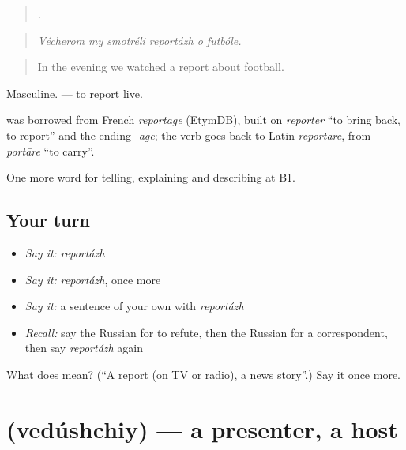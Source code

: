 \begin{quote}
     .
\end{quote}

\begin{quote}
\emph{Vécherom my smotréli reportázh o futbóle.}
\end{quote}

\begin{quote}
In the evening we watched a report about football.
\end{quote}

Masculine. \emph{ } — to report live.

\begin{cousinweb}
\emph{} was borrowed from French \emph{reportage} (EtymDB), built on \emph{reporter} \textquotedblleft{}to bring back, to report\textquotedblright{} and the ending \emph{-age}; the verb goes back to Latin \emph{reportāre}, from \emph{portāre} \textquotedblleft{}to carry\textquotedblright{}.
\end{cousinweb}

\begin{grammarlens}[title={What you've built}]
One more word for telling, explaining and describing at B1.
\end{grammarlens}

\subsection*{Your turn}
\begin{itemize}
\raggedright
  \item \emph{Say it:} \emph{reportázh}
  \item \emph{Say it:} \emph{reportázh}, once more
  \item \emph{Say it:} a sentence of your own with \emph{reportázh}
  \item \emph{Recall:} say the Russian for to refute, then the Russian for a correspondent, then say \emph{reportázh} again
\end{itemize}

\begin{tcolorbox}[breakable,colback=teal!4,colframe=teal!35!black,title={Before you move on}]
What does  mean? (\textquotedblleft{}A report (on TV or radio), a news story\textquotedblright{}.) Say it once more.
\end{tcolorbox}
\section[\texorpdfstring{\ru{ведущий} (vedúshchiy)}{ведущий (vedúshchiy)}]{ (vedúshchiy) — a presenter, a host}

